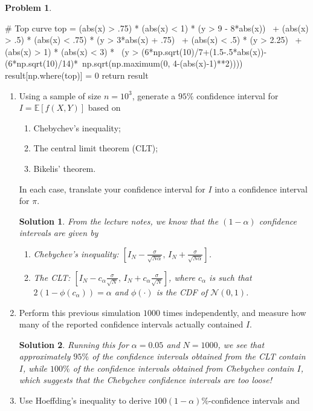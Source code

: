 \documentclass[11pt,a4paper]{article}
\theoremstyle{definition}
\newtheorem{problem}{Problem}
\theoremstyle{plain}
\newtheorem*{solution}{Solution}
\begin{document}
\begin{problem}
\begin{python}
    # Top curve
    top = (abs(x) > .75) * (abs(x) < 1) * (y > 9 - 8*abs(x)) \
          + (abs(x) > .5) * (abs(x) < .75) * (y > 3*abs(x) + .75) \
          + (abs(x) < .5) * (y > 2.25) \
          + (abs(x) > 1) * (abs(x) < 3) * \
            (y > (6*np.sqrt(10)/7+(1.5-.5*abs(x))-(6*np.sqrt(10)/14)*\
                  np.sqrt(np.maximum(0, 4-(abs(x)-1)**2))))
    result[np.where(top)] = 0
    return result
\end{python}
\begin{enumerate}
    \item Using a sample of size $n = 10^3$,
        generate a $95\%$ confidence interval for $I = \mathbb{E}[f(X,Y)]$ based on
        \begin{enumerate}
            \item Chebychev's inequality;
            \item The central limit theorem (CLT);
            \item Bikelis' theorem.
        \end{enumerate}
        In each case, translate your confidence interval for $I$ into a confidence interval for $\pi$.
\begin{solution}
    From the lecture notes, we know that the $(1 - \alpha)$ confidence intervals are given by
    \begin{enumerate}
        \item Chebychev's inequality: $\left[I_N - \frac{\sigma}{\sqrt{N\alpha}} , \, I_N + \frac{\sigma}{\sqrt{N\alpha}}\right]$.
        \item The CLT: $\left[I_N - c_\alpha\frac{\sigma}{\sqrt{N}} , \, I_N + c_\alpha\frac{\sigma}{\sqrt{N}}\right]$, where $c_\alpha$ is such that $2(1-\phi(c_\alpha)) = \alpha$ and $\phi(\cdot)$ is the CDF of $\mathcal{N}(0,1)$.
    \end{enumerate}
\end{solution}
    \item Perform this previous simulation $1000$ times independently,
        and measure how many of the reported confidence intervals actually contained $I$.
\begin{solution}
    Running this for $\alpha = 0.05$ and $N=1000$,
    we see that approximately $95\%$ of the confidence intervals obtained from the CLT contain $I$,
    while $100\%$ of the confidence intervals obtained from Chebychev contain $I$,
    which suggests that the Chebychev confidence intervals are too loose!
\end{solution}
    \item Use Hoeffding's inequality to derive $100(1-\alpha)\%$-confidence intervals and

\end{enumerate}
\end{problem}
\end{document}
